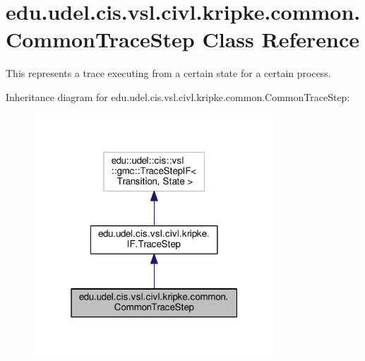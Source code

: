 \hypertarget{classedu_1_1udel_1_1cis_1_1vsl_1_1civl_1_1kripke_1_1common_1_1CommonTraceStep}{}\section{edu.\+udel.\+cis.\+vsl.\+civl.\+kripke.\+common.\+Common\+Trace\+Step Class Reference}
\label{classedu_1_1udel_1_1cis_1_1vsl_1_1civl_1_1kripke_1_1common_1_1CommonTraceStep}


This represents a trace executing from a certain state for a certain process.  




Inheritance diagram for edu.\+udel.\+cis.\+vsl.\+civl.\+kripke.\+common.\+Common\+Trace\+Step\+:
\nopagebreak
\begin{figure}[H]
\begin{center}
\leavevmode
\includegraphics[width=256pt]{classedu_1_1udel_1_1cis_1_1vsl_1_1civl_1_1kripke_1_1common_1_1CommonTraceStep__inherit__graph}
\end{center}
\end{figure}


